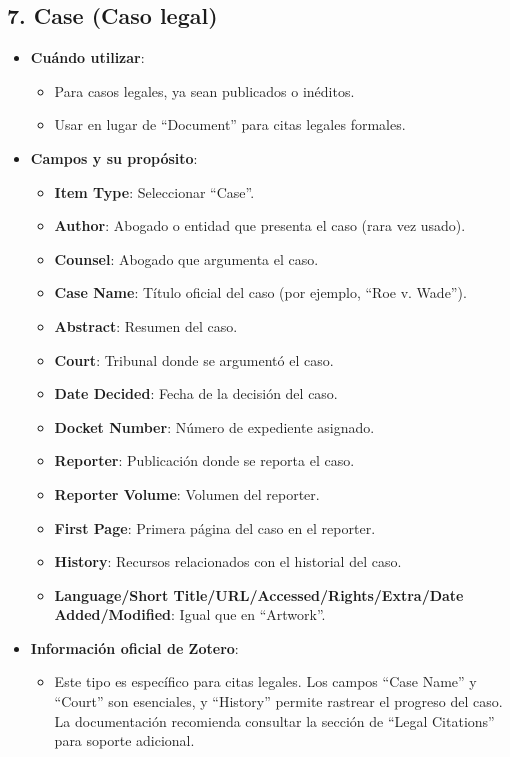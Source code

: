 \documentclass[
  jou,
  floatsintext,
  longtable,
  a4paper,
  nolmodern,
  notxfonts,
  notimes,
  colorlinks=true,linkcolor=blue,citecolor=blue,urlcolor=blue]{apa7}
\providecommand{\tightlist}{%
  \setlength{\itemsep}{0pt}\setlength{\parskip}{0pt}}
\begin{document}
\subsection{7. Case (Caso legal)}\label{case-caso-legal}

\begin{itemize}
\tightlist
\item
  \textbf{Cuándo utilizar}:

  \begin{itemize}
  \tightlist
  \item
    Para casos legales, ya sean publicados o inéditos.
  \item
    Usar en lugar de ``Document'' para citas legales formales.
  \end{itemize}
\item
  \textbf{Campos y su propósito}:

  \begin{itemize}
  \tightlist
  \item
    \textbf{Item Type}: Seleccionar ``Case''.
  \item
    \textbf{Author}: Abogado o entidad que presenta el caso (rara vez
    usado).
  \item
    \textbf{Counsel}: Abogado que argumenta el caso.
  \item
    \textbf{Case Name}: Título oficial del caso (por ejemplo, ``Roe v.
    Wade'').
  \item
    \textbf{Abstract}: Resumen del caso.
  \item
    \textbf{Court}: Tribunal donde se argumentó el caso.
  \item
    \textbf{Date Decided}: Fecha de la decisión del caso.
  \item
    \textbf{Docket Number}: Número de expediente asignado.
  \item
    \textbf{Reporter}: Publicación donde se reporta el caso.
  \item
    \textbf{Reporter Volume}: Volumen del reporter.
  \item
    \textbf{First Page}: Primera página del caso en el reporter.
  \item
    \textbf{History}: Recursos relacionados con el historial del caso.
  \item
    \textbf{Language/Short Title/URL/Accessed/Rights/Extra/Date
    Added/Modified}: Igual que en ``Artwork''.
  \end{itemize}
\item
  \textbf{Información oficial de Zotero}:

  \begin{itemize}
  \tightlist
  \item
    Este tipo es específico para citas legales. Los campos ``Case Name''
    y ``Court'' son esenciales, y ``History'' permite rastrear el
    progreso del caso. La documentación recomienda consultar la sección
    de ``Legal Citations'' para soporte adicional.
  \end{itemize}
\end{itemize}
\end{document}
